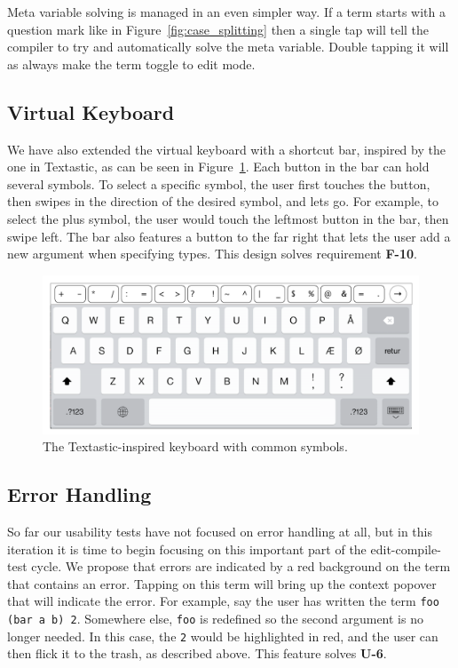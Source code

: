 Meta variable solving is managed in an even simpler way. If a term starts with
a question mark like in Figure~\ref{fig:case_splitting} then a single tap will
tell the compiler to try and automatically solve the meta variable. Double
tapping it will as always make the term toggle to edit mode.

\subsection{Virtual Keyboard}
\label{subsec:virtual_keyboard}
We have also extended the virtual keyboard with a shortcut bar, inspired by the one in Textastic, as can be seen in Figure~\ref{fig:design_keyboard}.
Each button in the bar can hold several symbols.
To select a specific symbol, the user first touches the button, then swipes in the direction of the desired symbol, and lets go.
For example, to select the plus symbol, the user would touch the leftmost button in the bar, then swipe left.
The bar also features a button to the far right that lets the user add a new argument when specifying types. 
This design solves requirement \textbf{F-10}. 

\begin{figure}
	\centering
		\includegraphics[width=115mm]{diagrams/design_keyboard.pdf}
	\caption{The Textastic-inspired keyboard with common symbols.}
\label{fig:design_keyboard}
\end{figure}

\subsection{Error Handling}
\label{subsec:error_handling}
So far our usability tests have not focused on error handling at all, but in this iteration it is time to begin focusing on this important part of the edit-compile-test cycle.
We propose that errors are indicated by a red background on the term that contains an error. 
Tapping on this term will bring up the context popover that will indicate the error.
For example, say the user has written the term \texttt{foo (bar a b) 2}.
Somewhere else, \texttt{foo} is redefined so the second argument is no longer needed.
In this case, the \texttt{2} would be highlighted in red, and the user can then flick it to the trash, as described above.
This feature solves \textbf{U-6}.

